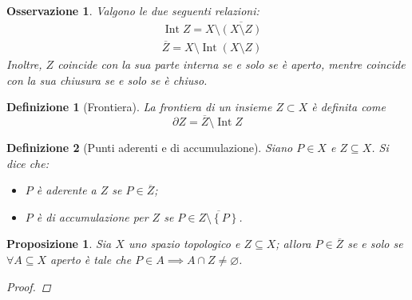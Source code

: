 \documentclass[12pt]{scrartcl}
\theoremstyle{style}
\newtheorem{definizione}{Definizione}[section]
\newtheorem{prop}{Proposizione}[section]
\newtheorem{osservazione}{Osservazione}[section]
\numberwithin{equation}{subsection}
\begin{document}
\begin{osservazione}
	Valgono le due seguenti relazioni:
\begin{equation}
	\begin{split}
		&\operatorname{Int} Z = X \setminus \overline{(X\setminus Z)}\\
		&\overline{Z} = X \setminus \operatorname{Int} (X \setminus Z)
	\end{split}
\end{equation}
Inoltre, $Z$ coincide con la sua parte interna se e solo se \`e aperto, mentre coincide con la sua chiusura se e solo se \`e chiuso.
\end{osservazione}
\begin{definizione}
	[Frontiera]
	La \textit{frontiera} di un insieme $Z \subset X$ \`e definita come
	\[
	\partial Z = \overline{Z }\setminus\operatorname{Int} Z
	\] 
\end{definizione}
\begin{definizione}
	[Punti aderenti e di accumulazione]
	Siano $P \in X$ e $Z \subseteq X$. Si dice che:
\begin{itemize}
	\item $P$ \`e \textit{aderente} a $Z$ se $P\in \overline{Z}$;
	\item $P$ \`e \textit{di accumulazione} per $Z$ se $P \in \overline{Z \setminus\left\{ P \right\} }$.
\end{itemize}
\end{definizione}
\begin{prop}
	Sia $X$ uno spazio topologico e $Z \subseteq X$; allora $P \in \overline{Z}$ se e solo se $\forall A \subseteq X$ aperto \`e tale che $P \in A\implies A\cap Z \neq \varnothing$.
	\begin{proof}
		
	\end{proof}
\end{prop}
\end{document}
